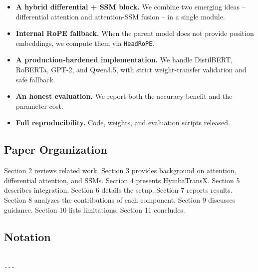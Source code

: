\begin{itemize}
\item \textbf{A hybrid differential + SSM block.} We combine two emerging ideas --
  differential attention and attention-SSM fusion -- in a single module.
\item \textbf{Internal RoPE fallback.} When the parent model does not provide
  position embeddings, we compute them via \texttt{HeadRoPE}.
\item \textbf{A production-hardened implementation.} We handle DistilBERT, RoBERTa,
  GPT-2, and Qwen3.5, with strict weight-transfer validation and safe
  fallback.
\item \textbf{An honest evaluation.} We report both the accuracy benefit and the
  parameter cost.
\item \textbf{Full reproducibility.} Code, weights, and evaluation scripts released.

\end{itemize}
\subsection{Paper Organization}

Section 2 reviews related work. Section 3 provides background on attention, 
differential attention, and SSMs. Section 4 presents HymbaTransX. Section 5 
describes integration. Section 6 details the setup. Section 7 reports 
results. Section 8 analyzes the contributions of each component. Section 9 
discusses guidance. Section 10 lists limitations. Section 11 concludes.



\subsection{Notation}

\begin{lstlisting}

---
\end{lstlisting}